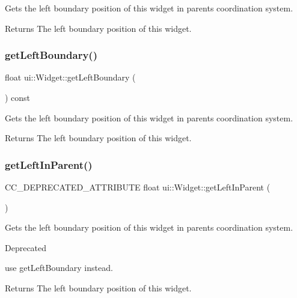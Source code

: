 Gets the left boundary position of this widget in parent\textquotesingle{}s coordination system. \begin{DoxyReturn}{Returns}
The left boundary position of this widget. 
\end{DoxyReturn}
\mbox{\label{classui_1_1Widget_a8385fe9b6ee78928d9c585e2faf0bc0d}} 
\subsubsection{\texorpdfstring{get\+Left\+Boundary()}{getLeftBoundary()}\hspace{0.1cm}{\footnotesize\ttfamily [2/2]}}
{\footnotesize\ttfamily float ui\+::\+Widget\+::get\+Left\+Boundary (\begin{DoxyParamCaption}{ }\end{DoxyParamCaption}) const}

Gets the left boundary position of this widget in parent\textquotesingle{}s coordination system. \begin{DoxyReturn}{Returns}
The left boundary position of this widget. 
\end{DoxyReturn}
\mbox{\label{classui_1_1Widget_a316405b0bce9cb99a3efcef9b9754a86}} 
\subsubsection{\texorpdfstring{get\+Left\+In\+Parent()}{getLeftInParent()}\hspace{0.1cm}{\footnotesize\ttfamily [1/2]}}
{\footnotesize\ttfamily C\+C\+\_\+\+D\+E\+P\+R\+E\+C\+A\+T\+E\+D\+\_\+\+A\+T\+T\+R\+I\+B\+U\+TE float ui\+::\+Widget\+::get\+Left\+In\+Parent (\begin{DoxyParamCaption}{ }\end{DoxyParamCaption})\hspace{0.3cm}{\ttfamily [inline]}}

Gets the left boundary position of this widget in parent\textquotesingle{}s coordination system. \begin{DoxyRefDesc}{Deprecated}
\item[\hyperlink{deprecated__deprecated000168}{Deprecated}]use {\ttfamily get\+Left\+Boundary} instead. \end{DoxyRefDesc}
\begin{DoxyReturn}{Returns}
The left boundary position of this widget. 
\end{DoxyReturn}
\mbox{\label{classui_1_1Widget_a316405b0bce9cb99a3efcef9b9754a86}} 
